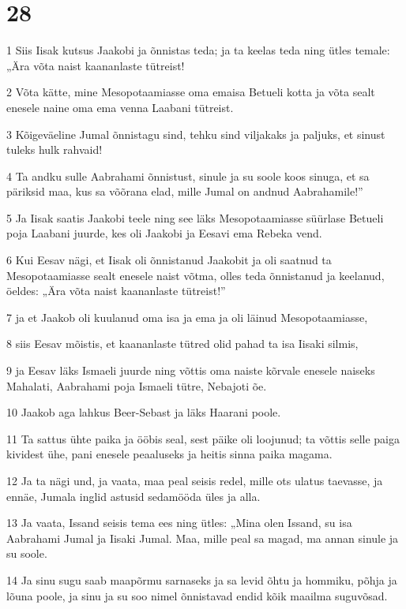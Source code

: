 \chapter{28}

\par 1 Siis Iisak kutsus Jaakobi ja õnnistas teda; ja ta keelas teda ning ütles temale: „Ära võta naist kaananlaste tütreist!
\par 2 Võta kätte, mine Mesopotaamiasse oma emaisa Betueli kotta ja võta sealt enesele naine oma ema venna Laabani tütreist.
\par 3 Kõigeväeline Jumal õnnistagu sind, tehku sind viljakaks ja paljuks, et sinust tuleks hulk rahvaid!
\par 4 Ta andku sulle Aabrahami õnnistust, sinule ja su soole koos sinuga, et sa päriksid maa, kus sa võõrana elad, mille Jumal on andnud Aabrahamile!”
\par 5 Ja Iisak saatis Jaakobi teele ning see läks Mesopotaamiasse süürlase Betueli poja Laabani juurde, kes oli Jaakobi ja Eesavi ema Rebeka vend.
\par 6 Kui Eesav nägi, et Iisak oli õnnistanud Jaakobit ja oli saatnud ta Mesopotaamiasse sealt enesele naist võtma, olles teda õnnistanud ja keelanud, öeldes: „Ära võta naist kaananlaste tütreist!”
\par 7 ja et Jaakob oli kuulanud oma isa ja ema ja oli läinud Mesopotaamiasse,
\par 8 siis Eesav mõistis, et kaananlaste tütred olid pahad ta isa Iisaki silmis,
\par 9 ja Eesav läks Ismaeli juurde ning võttis oma naiste kõrvale enesele naiseks Mahalati, Aabrahami poja Ismaeli tütre, Nebajoti õe.
\par 10 Jaakob aga lahkus Beer-Sebast ja läks Haarani poole.
\par 11 Ta sattus ühte paika ja ööbis seal, sest päike oli loojunud; ta võttis selle paiga kividest ühe, pani enesele peaaluseks ja heitis sinna paika magama.
\par 12 Ja ta nägi und, ja vaata, maa peal seisis redel, mille ots ulatus taevasse, ja ennäe, Jumala inglid astusid sedamööda üles ja alla.
\par 13 Ja vaata, Issand seisis tema ees ning ütles: „Mina olen Issand, su isa Aabrahami Jumal ja Iisaki Jumal. Maa, mille peal sa magad, ma annan sinule ja su soole.
\par 14 Ja sinu sugu saab maapõrmu sarnaseks ja sa levid õhtu ja hommiku, põhja ja lõuna poole, ja sinu ja su soo nimel õnnistavad endid kõik maailma suguvõsad.
